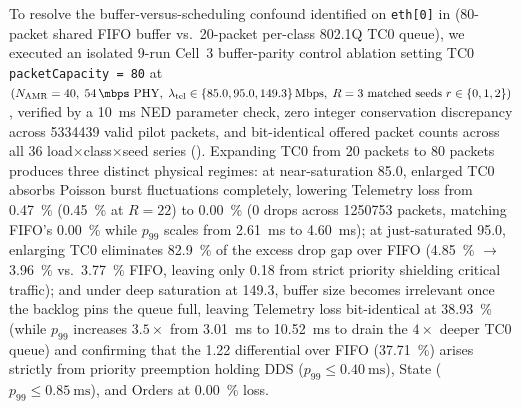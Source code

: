 \documentclass[11pt,a4paper]{article}
\newcommand{\Namr}{\ensuremath{N_{\mathrm{AMR}}}}
\newcommand{\ltel}{\ensuremath{\lambda_{\mathrm{tel}}}}
\begin{document}
To resolve the buffer-versus-scheduling confound identified on \texttt{eth[0]} in  (80-packet shared FIFO buffer vs.\ 20-packet per-class 802.1Q TC0 queue), we executed an isolated 9-run Cell~3 buffer-parity control ablation setting TC0 \texttt{packetCapacity = 80} at $(\Namr=40,\; \qty{54}{\mbps}\text{ PHY},\; \ltel \in \{85.0, 95.0, 149.3\}\,\text{Mbps},\; R=3\text{ matched seeds } r \in \{0,1,2\})$, verified by a \qty{10}{\milli\second} NED parameter check, zero integer conservation discrepancy across \num{5334439} valid pilot packets, and bit-identical offered packet counts across all $36$ load$\times$class$\times$seed series (). Expanding TC0 from 20 packets to 80 packets produces three distinct physical regimes: at near-saturation \qty{85.0}{\mbps}, enlarged TC0 absorbs Poisson burst fluctuations completely, lowering Telemetry loss from \qty{0.47}{\percent} (\qty{0.45}{\percent} at $R=22$) to \qty{0.00}{\percent} ($0$ drops across \num{1250753} packets, matching FIFO's \qty{0.00}{\percent} while $p_{99}$ scales from \qty{2.61}{\milli\second} to \qty{4.60}{\milli\second}); at just-saturated \qty{95.0}{\mbps}, enlarging TC0 eliminates \qty{82.9}{\percent} of the excess drop gap over FIFO (\qty{4.85}{\percent} $\to$ \qty{3.96}{\percent} vs.\ \qty{3.77}{\percent} FIFO, leaving only \qty{+0.18}{\pp} from strict priority shielding critical traffic); and under deep saturation at \qty{149.3}{\mbps}, buffer size becomes irrelevant once the backlog pins the queue full, leaving Telemetry loss bit-identical at \qty{38.93}{\percent} (while $p_{99}$ increases $3.5\times$ from \qty{3.01}{\milli\second} to \qty{10.52}{\milli\second} to drain the $4\times$ deeper TC0 queue) and confirming that the \qty{+1.22}{\pp} differential over FIFO (\qty{37.71}{\percent}) arises strictly from priority preemption holding DDS ($p_{99} \le \qty{0.40}{\milli\second}$), State ($p_{99} \le \qty{0.85}{\milli\second}$), and Orders at \qty{0.00}{\percent} loss.
\end{document}
